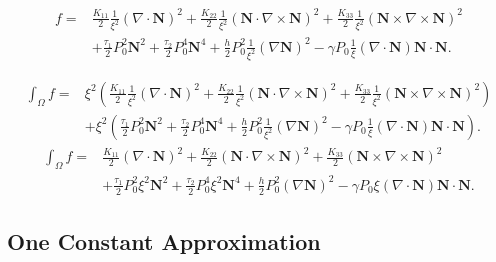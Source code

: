\documentclass[oneside,english]{amsart}
\numberwithin{equation}{section}
\numberwithin{figure}{section}
\begin{document}
\begin{align*}
f= & \frac{K_{11}}{2}\frac{1}{\xi^{2}}\left(\nabla\cdot\mathbf{N}\right)^{2}+\frac{K_{22}}{2}\frac{1}{\xi^{2}}\left(\mathbf{N}\cdot\nabla\times\mathbf{N}\right)^{2}+\frac{K_{33}}{2}\frac{1}{\xi^{2}}\left(\mathbf{N}\times\nabla\times\mathbf{N}\right)^{2}\\
 & +\frac{\tau_{1}}{2}P_{0}^{2}\mathbf{N}^{2}+\frac{\tau_{2}}{2}P_{0}^{4}\mathbf{N}^{4}+\frac{h}{2}P_{0}^{2}\frac{1}{\xi^{2}}\left(\nabla\mathbf{N}\right)^{2}-\gamma P_{0}\frac{1}{\xi}\left(\nabla\cdot\mathbf{N}\right)\mathbf{N}\cdot\mathbf{N}.
\end{align*}

\begin{align*}
\int_{\Omega}f= & \xi^{2}\left(\frac{K_{11}}{2}\frac{1}{\xi^{2}}\left(\nabla\cdot\mathbf{N}\right)^{2}+\frac{K_{22}}{2}\frac{1}{\xi^{2}}\left(\mathbf{N}\cdot\nabla\times\mathbf{N}\right)^{2}+\frac{K_{33}}{2}\frac{1}{\xi^{2}}\left(\mathbf{N}\times\nabla\times\mathbf{N}\right)^{2}\right)\\
 & +\xi^{2}\left(\frac{\tau_{1}}{2}P_{0}^{2}\mathbf{N}^{2}+\frac{\tau_{2}}{2}P_{0}^{4}\mathbf{N}^{4}+\frac{h}{2}P_{0}^{2}\frac{1}{\xi^{2}}\left(\nabla\mathbf{N}\right)^{2}-\gamma P_{0}\frac{1}{\xi}\left(\nabla\cdot\mathbf{N}\right)\mathbf{N}\cdot\mathbf{N}\right).
\end{align*}
\begin{align*}
\int_{\Omega}f= & \frac{K_{11}}{2}\left(\nabla\cdot\mathbf{N}\right)^{2}+\frac{K_{22}}{2}\left(\mathbf{N}\cdot\nabla\times\mathbf{N}\right)^{2}+\frac{K_{33}}{2}\left(\mathbf{N}\times\nabla\times\mathbf{N}\right)^{2}\\
 & +\frac{\tau_{1}}{2}P_{0}^{2}\xi^{2}\mathbf{N}^{2}+\frac{\tau_{2}}{2}P_{0}^{4}\xi^{2}\mathbf{N}^{4}+\frac{h}{2}P_{0}^{2}\left(\nabla\mathbf{N}\right)^{2}-\gamma P_{0}\xi\left(\nabla\cdot\mathbf{N}\right)\mathbf{N}\cdot\mathbf{N}.
\end{align*}


\subsection*{One Constant Approximation}
\end{document}
